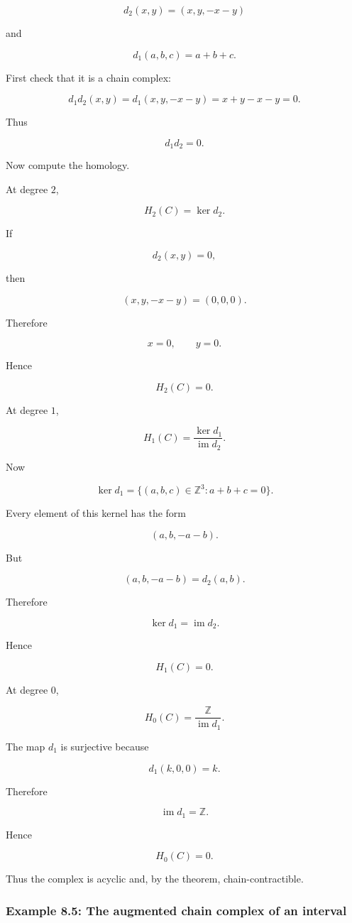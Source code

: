 \documentclass[12pt,a4paper]{article}
\theoremstyle{notespace}
\begin{document}
\[
d_2(x,y)=(x,y,-x-y)
\]

and

\[
d_1(a,b,c)=a+b+c.
\]

First check that it is a chain complex:

\[
d_1d_2(x,y)
=
d_1(x,y,-x-y)
=
x+y-x-y
=
0.
\]

Thus

\[
d_1d_2=0.
\]

Now compute the homology.

At degree \(2\),

\[
H_2(C)=\ker d_2.
\]

If

\[
d_2(x,y)=0,
\]

then

\[
(x,y,-x-y)=(0,0,0).
\]

Therefore

\[
x=0,
\qquad
y=0.
\]

Hence

\[
H_2(C)=0.
\]

At degree \(1\),

\[
H_1(C)=\frac{\ker d_1}{\operatorname{im}d_2}.
\]

Now

\[
\ker d_1
=
\{(a,b,c)\in\mathbb Z^3:a+b+c=0\}.
\]

Every element of this kernel has the form

\[
(a,b,-a-b).
\]

But

\[
(a,b,-a-b)=d_2(a,b).
\]

Therefore

\[
\ker d_1=\operatorname{im}d_2.
\]

Hence

\[
H_1(C)=0.
\]

At degree \(0\),

\[
H_0(C)=\frac{\mathbb Z}{\operatorname{im}d_1}.
\]

The map \(d_1\) is surjective because

\[
d_1(k,0,0)=k.
\]

Therefore

\[
\operatorname{im}d_1=\mathbb Z.
\]

Hence

\[
H_0(C)=0.
\]

Thus the complex is acyclic and, by the theorem, chain-contractible.

\subsubsection{Example 8.5: The augmented chain complex of an interval}
\end{document}
